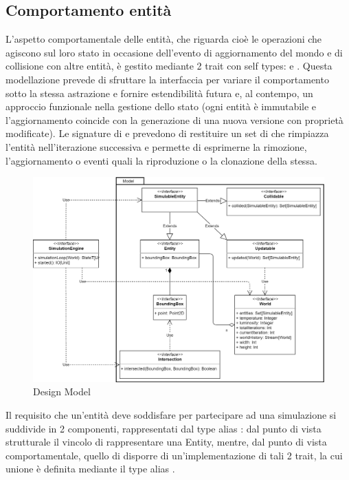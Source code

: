 \subsection{Comportamento entità}
L’aspetto comportamentale delle entità, che riguarda cioè le operazioni che agiscono sul loro stato in occasione dell’evento di aggiornamento del mondo e di collisione con altre entità, è gestito mediante 2 trait con self types:  e . Questa modellazione prevede di sfruttare la interfaccia per variare il comportamento sotto la stessa astrazione e fornire estendibilità futura e, al contempo, un approccio funzionale nella gestione dello stato (ogni entità è immutabile e l’aggiornamento coincide con la generazione di una nuova versione con proprietà modificate). Le signature di  e  prevedono di restituire un set di  che rimpiazza l’entità nell’iterazione successiva e permette di esprimerne la rimozione, l’aggiornamento o eventi quali la riproduzione o la clonazione della stessa.

\begin{figure}[h!]
\centering
\includegraphics[width=\textwidth, scale=0.14]{img/Model.png}
\caption{Design Model}
\label{fig:model}
\end{figure}

Il requisito che un’entità deve soddisfare per partecipare ad una simulazione si suddivide in 2 componenti, rappresentati dal type alias : dal punto di vista strutturale il vincolo di rappresentare una Entity, mentre, dal punto di vista comportamentale, quello di disporre di un’implementazione di tali 2 trait, la cui unione è definita mediante il type alias .

